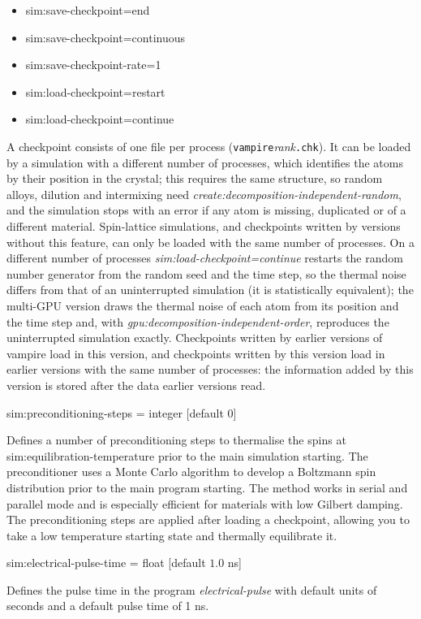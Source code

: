 \begin{itemize}
  \item[] sim:save-checkpoint=end
  \item[] sim:save-checkpoint=continuous
  \item[] sim:save-checkpoint-rate=1
  \item[] sim:load-checkpoint=restart
  \item[] sim:load-checkpoint=continue
\end{itemize}

A checkpoint consists of one file per process (\texttt{vampire}\textit{rank}\texttt{.chk}). It can be loaded by a simulation with a different number of processes, which identifies the atoms by their position in the crystal; this requires the same structure, so random alloys, dilution and intermixing need \textit{create:decomposition-independent-random}, and the simulation stops with an error if any atom is missing, duplicated or of a different material. Spin-lattice simulations, and checkpoints written by versions without this feature, can only be loaded with the same number of processes. On a different number of processes \textit{sim:load-checkpoint=continue} restarts the random number generator from the random seed and the time step, so the thermal noise differs from that of an uninterrupted simulation (it is statistically equivalent); the multi-GPU version draws the thermal noise of each atom from its position and the time step and, with \textit{gpu:decomposition-independent-order}, reproduces the uninterrupted simulation exactly. Checkpoints written by earlier versions of vampire load in this version, and checkpoints written by this version load in earlier versions with the same number of processes: the information added by this version is stored after the data earlier versions read.

{\zicf sim:preconditioning-steps = integer [default 0]} Defines a number of preconditioning steps to thermalise the spins at sim:equilibration-temperature prior to the main simulation starting. The preconditioner uses a Monte Carlo algorithm to develop a Boltzmann spin distribution prior to the main program starting. The method works in serial and parallel mode and is especially efficient for materials with low Gilbert damping. The preconditioning steps are applied after loading a checkpoint, allowing you to take a low temperature starting state and thermally equilibrate it.

{\zicf sim:electrical-pulse-time = float [default $1.0$ ns]}
Defines the pulse time in the program \textit{electrical-pulse} with default
units of seconds and a default pulse time of 1 ns.

